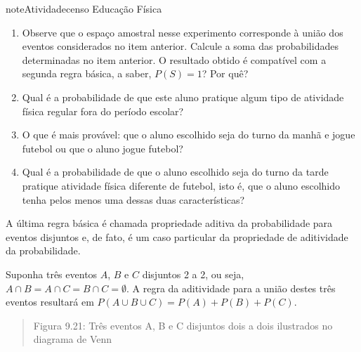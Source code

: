 \begin{sphinxadmonition}{note}{Atividade}{censo Educação Física}
\begin{enumerate}
\item {} 
Observe que o espaço amostral nesse experimento corresponde à união dos eventos considerados no item anterior. Calcule a soma das probabilidades determinadas no item anterior. O resultado obtido é compatível com a segunda regra básica, a saber, \(P(S)=1\)? Por quê?

\item {} 
Qual é a probabilidade de que este aluno pratique algum tipo de atividade física regular fora do período escolar?

\item {} 
O que é mais provável: que o aluno escolhido seja do turno da manhã e jogue futebol ou que o aluno jogue futebol?

\item {} 
Qual é a probabilidade de que o aluno escolhido seja do turno da tarde  pratique atividade física diferente de futebol, isto é, que o aluno escolhido tenha pelos menos uma dessas duas características?

\end{enumerate}
\end{sphinxadmonition}


\label{\detokenize{PE511-4:sec-organizando-propriedades}}\label{\detokenize{PE511-4::doc}}\label{\detokenize{PE511-4:organizando-probabilidade-regras-basicas-e-propriedades}}
A última regra básica é chamada propriedade aditiva da probabilidade para eventos disjuntos e, de fato, é um caso particular da propriedade de aditividade da probabilidade.

Suponha três eventos \(A\), \(B\) e \(C\) disjuntos 2 a 2, ou seja, \(A\cap B=A\cap C=B\cap C=\emptyset\). A regra da aditividade para a união destes três eventos resultará em \(P(A\cup B\cup C)=P(A)+P(B)+P(C)\).
\begin{quote}
\begin{center}\end{center}
Figura 9.21: Três eventos A, B e C disjuntos dois a dois ilustrados no diagrama de Venn
\end{quote}

